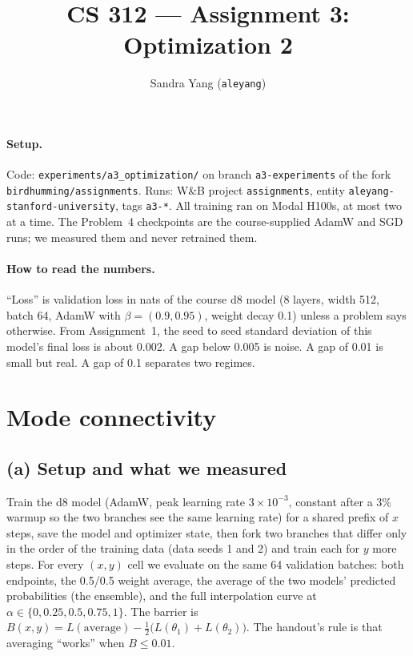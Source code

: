 \documentclass[10pt,letterpaper]{article}
\title{\vspace{-1.6em}CS 312 --- Assignment 3: Optimization 2\vspace{-0.4em}}
\author{Sandra Yang (\texttt{aleyang})}
\date{\vspace{-0.6em}}
\begin{document}
\maketitle
\vspace{-2em}

\paragraph{Setup.} Code: \texttt{experiments/a3\_optimization/} on branch \texttt{a3-experiments} of the fork \texttt{birdhumming/assignments}. Runs: W\&B project \texttt{assignments}, entity \texttt{aleyang-stanford-university}, tags \texttt{a3-*}. All training ran on Modal H100s, at most two at a time. The Problem~4 checkpoints are the course-supplied AdamW and SGD runs; we measured them and never retrained them. %

\paragraph{How to read the numbers.} ``Loss'' is validation loss in nats of the course d8 model (8 layers, width 512, batch 64, AdamW with $\beta=(0.9,0.95)$, weight decay 0.1) unless a problem says otherwise. From Assignment~1, the seed to seed standard deviation of this model's final loss is about 0.002. A gap below 0.005 is noise. A gap of 0.01 is small but real. A gap of 0.1 separates two regimes.

\section{Mode connectivity}

\subsection*{(a) Setup and what we measured}

Train the d8 model (AdamW, peak learning rate $3\times10^{-3}$, constant after a 3\% warmup so the two branches see the same learning rate) for a shared prefix of $x$ steps, save the model and optimizer state, then fork two branches that differ only in the order of the training data (data seeds 1 and 2) and train each for $y$ more steps. For every $(x,y)$ cell we evaluate on the same 64 validation batches: both endpoints, the 0.5/0.5 weight average, the average of the two models' predicted probabilities (the ensemble), and the full interpolation curve at $\alpha\in\{0,0.25,0.5,0.75,1\}$. The barrier is $B(x,y)=L(\text{average})-\tfrac12\big(L(\theta_1)+L(\theta_2)\big)$. The handout's rule is that averaging ``works'' when $B\le0.01$.
\end{document}
